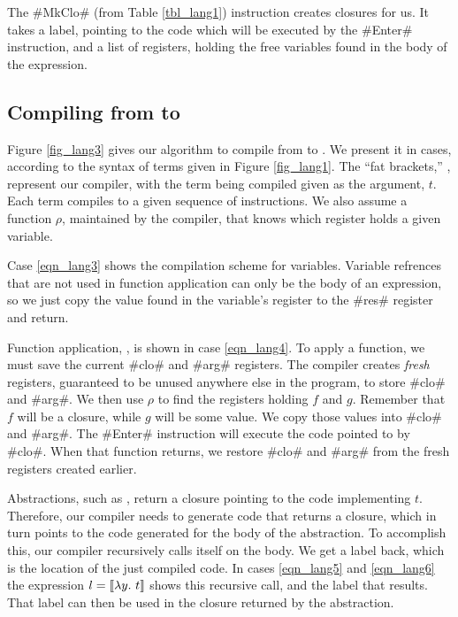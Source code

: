 \documentclass[12pt]{report}
\begin{document}
The #MkClo# (from Table \ref{tbl_lang1}) instruction creates closures
for us. It takes a label, pointing to the code which will be executed
by the #Enter# instruction, and a list of registers, holding the free
variables found in the body of the expression.

\subsection{Compiling from \lamA to \machLam}

Figure \ref{fig_lang3} gives our algorithm to compile from \lamA to
\machLam. We present it in cases, according to the syntax of \lamA
terms given in Figure \ref{fig_lang1}. The ``fat brackets,''
, represent our compiler, with the term being
compiled given as the argument, $t$.  Each term compiles to a given
sequence of instructions. We also assume a function $\rho$, maintained
by the compiler, that knows which register holds a given variable.

Case \ref{eqn_lang3} shows the compilation
scheme for variables. Variable refrences that are not used
in function application can only be the body of an expression, so we
just copy the value found in the variable's register to the #res#
register and return.

Function application, , is shown in case
\ref{eqn_lang4}. To apply a function, we must save the current #clo#
and #arg# registers. The compiler creates \emph{fresh} registers,
guaranteed to be unused anywhere else in the program, to store #clo#
and #arg#. We then use $\rho$ to find the registers holding $f$ and
$g$. Remember that $f$ will be a closure, while $g$ will be some
value. We copy those values into #clo# and #arg#. The #Enter#
instruction will execute the code pointed to by #clo#. When that
function returns, we restore #clo# and #arg# from the fresh registers
created earlier.

Abstractions, such as , return a closure pointing to the
code implementing $t$. Therefore, our compiler needs to generate code
that returns a closure, which in turn points to the code generated for
the body of the abstraction. To accomplish this, our compiler
recursively calls itself on the body. We get a label back, which is the
location of the just compiled code. In cases \ref{eqn_lang5} and
\ref{eqn_lang6} the expression $l = \llbracket \lambda y.\ t \rrbracket$ shows this
recursive call, and the label that results. That label can then be used in the 
closure returned by the abstraction.
\end{document}
